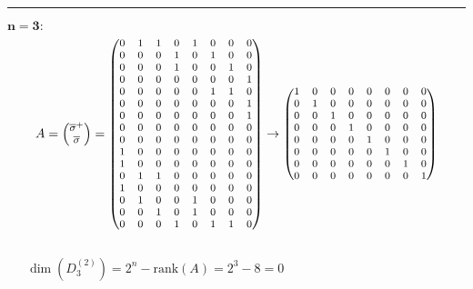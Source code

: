 \medskip\hrule\medskip

\noindent$\mathbf{n = 3:}$
\begin{equation}
{\footnotesize
	A =
	\begin{pmatrix}
		\overline{\sigma}^{+}\\
		\overline{\sigma}
	\end{pmatrix}=
	\begin{pmatrix}
		0 & 1 & 1 & 0 & 1 & 0 & 0 & 0\\
		0 & 0 & 0 & 1 & 0 & 1 & 0 & 0\\
		0 & 0 & 0 & 1 & 0 & 0 & 1 & 0\\
		0 & 0 & 0 & 0 & 0 & 0 & 0 & 1\\
		0 & 0 & 0 & 0 & 0 & 1 & 1 & 0\\
		0 & 0 & 0 & 0 & 0 & 0 & 0 & 1\\
		0 & 0 & 0 & 0 & 0 & 0 & 0 & 1\\
		0 & 0 & 0 & 0 & 0 & 0 & 0 & 0\\
		0 & 0 & 0 & 0 & 0 & 0 & 0 & 0\\
		1 & 0 & 0 & 0 & 0 & 0 & 0 & 0\\
		1 & 0 & 0 & 0 & 0 & 0 & 0 & 0\\
		0 & 1 & 1 & 0 & 0 & 0 & 0 & 0\\
		1 & 0 & 0 & 0 & 0 & 0 & 0 & 0\\
		0 & 1 & 0 & 0 & 1 & 0 & 0 & 0\\
		0 & 0 & 1 & 0 & 1 & 0 & 0 & 0\\
		0 & 0 & 0 & 1 & 0 & 1 & 1 & 0\\
	\end{pmatrix}\rightarrow
	\begin{pmatrix}
		1 & 0 & 0 & 0 & 0 & 0 & 0 & 0\\
		0 & 1 & 0 & 0 & 0 & 0 & 0 & 0\\
		0 & 0 & 1 & 0 & 0 & 0 & 0 & 0\\
		0 & 0 & 0 & 1 & 0 & 0 & 0 & 0\\
		0 & 0 & 0 & 0 & 1 & 0 & 0 & 0\\
		0 & 0 & 0 & 0 & 0 & 1 & 0 & 0\\
		0 & 0 & 0 & 0 & 0 & 0 & 1 & 0\\
		0 & 0 & 0 & 0 & 0 & 0 & 0 & 1\\
	\end{pmatrix}
}
\end{equation}
\
\\[12pt]

\noindent\qquad~~~$\dim(D^{(2)}_3) = 2^{n} - \mathrm{rank}(A) = 2^{3} - 8 = 0$\\

